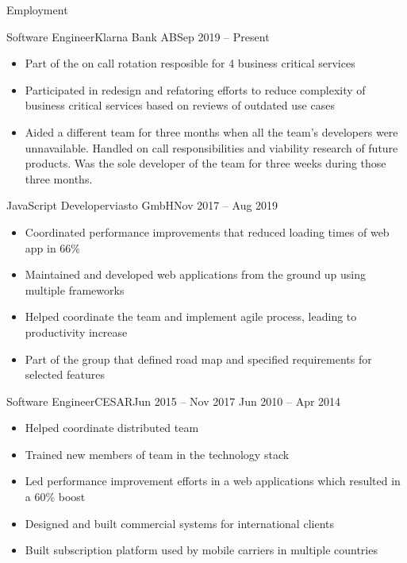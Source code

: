 \documentclass[]{mcdowellcv}
\begin{document}
	\makeheader

	\begin{cvsection}{Employment}
        \begin{cvsubsection}{Software Engineer}{Klarna Bank AB}{Sep 2019 -- Present}
            \begin{itemize}
                \item Part of the on call rotation resposible for 4 business critical services
                \item Participated in redesign and refatoring efforts to reduce complexity of business critical services based on reviews of outdated use cases
                \item Aided a different team for three months when all the team's developers were unnavailable. Handled on call responsibilities and viability research of future products. Was the sole developer of the team for three weeks during those three months.
            \end{itemize}
        \end{cvsubsection}

        \begin{cvsubsection}{JavaScript Developer}{viasto GmbH}{Nov 2017 -- Aug 2019}
            \begin{itemize}
                \item Coordinated performance improvements that reduced loading times of web app in 66\%
                \item Maintained and developed web applications from the ground up using multiple frameworks
                \item Helped coordinate the team and implement agile process, leading to productivity increase
                \item Part of the group that defined road map and specified requirements for selected features
            \end{itemize}
        \end{cvsubsection}

		\begin{cvsubsection}{Software Engineer}{CESAR}{Jun 2015 -- Nov 2017 \linebreak Jun 2010 -- Apr 2014}
			\begin{itemize}
                \item Helped coordinate distributed team
                \item Trained new members of team in the technology stack
                \item Led performance improvement efforts in a web applications which resulted in a 60\% boost
                \item Designed and built commercial systems for international clients
                \item Built subscription platform used by mobile carriers in multiple countries
			\end{itemize}
		\end{cvsubsection}
	\end{cvsection}
\end{document}
